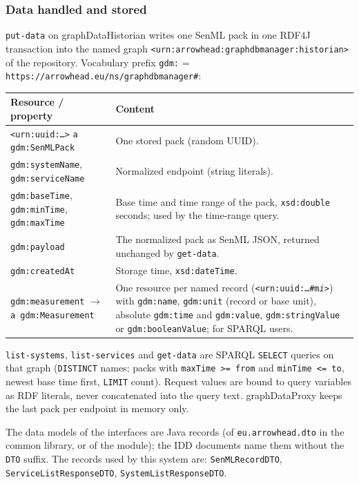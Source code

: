 \documentclass[a4paper]{arrowhead}
\begin{document}
\subsubsection{Data handled and stored}

\texttt{put-\allowbreak{}data} on graphDataHistorian writes one SenML pack in one RDF4J transaction into the named graph \texttt{<urn:\allowbreak{}arrowhead:\allowbreak{}graphdbmanager:\allowbreak{}historian>} of the repository. Vocabulary prefix \texttt{gdm:} = \texttt{https://\allowbreak{}arrowhead.eu/\allowbreak{}ns/\allowbreak{}graphdbmanager\#}:

\noindent\begin{longtable}{| p{5.0cm} | p{10.2cm} |} \hline
\rowcolor{gray!33} Resource / property & Content \\ \hline \endhead
\texttt{<urn:uuid:\ldots>} \texttt{a gdm:SenMLPack} & One stored pack (random UUID). \\ \hline
\texttt{gdm:systemName}, \texttt{gdm:serviceName} & Normalized endpoint (string literals). \\ \hline
\texttt{gdm:baseTime}, \texttt{gdm:minTime}, \texttt{gdm:maxTime} & Base time and time range of the pack, \texttt{xsd:double} seconds; used by the time-range query. \\ \hline
\texttt{gdm:payload} & The normalized pack as SenML JSON, returned unchanged by \texttt{get-\allowbreak{}data}. \\ \hline
\texttt{gdm:createdAt} & Storage time, \texttt{xsd:dateTime}. \\ \hline
\texttt{gdm:measurement} $\rightarrow$ \texttt{a gdm:Measurement} & One resource per named record (\texttt{<urn:uuid:\ldots\#m\textit{i}>}) with \texttt{gdm:name}, \texttt{gdm:unit} (record or base unit), absolute \texttt{gdm:time} and \texttt{gdm:value}, \texttt{gdm:stringValue} or \texttt{gdm:booleanValue}; for SPARQL users. \\ \hline
\end{longtable}

\texttt{list-\allowbreak{}systems}, \texttt{list-\allowbreak{}services} and \texttt{get-\allowbreak{}data} are SPARQL \texttt{SELECT} queries \cite{sparql11} on that graph (\texttt{DISTINCT} names; packs with \texttt{maxTime >= from} and \texttt{minTime <= to}, newest base time first, \texttt{LIMIT} count). Request values are bound to query variables as RDF literals, never concatenated into the query text. graphDataProxy keeps the last pack per endpoint in memory only.

The data models of the interfaces are Java records (of \texttt{eu.arrowhead.dto} in the common library, or of the module); the IDD documents name them without the \texttt{DTO} suffix. The records used by this system are: \texttt{SenMLRecordDTO}, \texttt{Service\allowbreak{}List\allowbreak{}Response\allowbreak{}DTO}, \texttt{System\allowbreak{}List\allowbreak{}Response\allowbreak{}DTO}.
\end{document}
